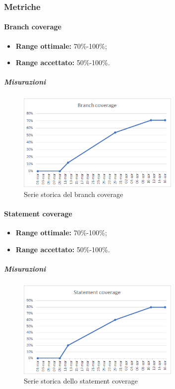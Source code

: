 		\subsubsection{Metriche}
			\paragraph{Branch coverage}  \Spazio
			\begin{itemize}
				\item \textbf{Range ottimale:} 70\%-100\%;
				\item \textbf{Range accettato:} 50\%-100\%.
		    \end{itemize}
	        \subparagraph{Misurazioni}
	        \begin{figure}[H]
	        	\centering 
	        	\includegraphics[width=0.7\textwidth]{Images/branch.png}
	        	\caption{Serie storica del branch coverage}
	        	\label{branch} 
	        \end{figure}
			\paragraph{Statement coverage} \Spazio
				\begin{itemize}
					\item \textbf{Range ottimale:} 70\%-100\%;
					\item \textbf{Range accettato:} 50\%-100\%.
		    	\end{itemize}
	    	    \subparagraph{Misurazioni}
	    	    \begin{figure}[H]
	    	    	\centering 
	    	    	\includegraphics[width=0.7\textwidth]{Images/statement.png}
	    	    	\caption{Serie storica dello statement coverage}
	    	    	\label{statement} 
	    	    \end{figure}
